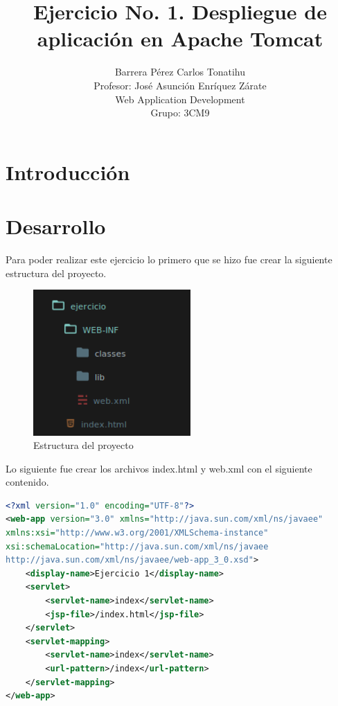 \documentclass[a4paper,12pt]{article}
\title{Ejercicio No. 1. Despliegue de aplicación en Apache Tomcat}
\author{Barrera Pérez Carlos Tonatihu \\ Profesor: José Asunción Enríquez 
Zárate 
\\ Web Application Development \\ Grupo: 3CM9 }
\begin{document}
\maketitle
\newpage
\tableofcontents
\newpage

\section{Introducción}
\section{Desarrollo}
Para poder realizar este ejercicio lo primero que se hizo fue crear la 
siguiente estructura del proyecto.

\begin{figure}[H]
\begin{center}
 \includegraphics[width=6cm]{estructura.png}
 \caption{Estructura del proyecto}
 \label{fig:estructura}
\end{center}
\end{figure}

Lo siguiente fue crear los archivos index.html y web.xml con el siguiente 
contenido.

\begin{lstlisting}[language=XML, style=customXML, 
caption={web.xml},captionpos=b]
<?xml version="1.0" encoding="UTF-8"?>
<web-app version="3.0" xmlns="http://java.sun.com/xml/ns/javaee" 
xmlns:xsi="http://www.w3.org/2001/XMLSchema-instance" 
xsi:schemaLocation="http://java.sun.com/xml/ns/javaee 
http://java.sun.com/xml/ns/javaee/web-app_3_0.xsd">
    <display-name>Ejercicio 1</display-name>
    <servlet>
        <servlet-name>index</servlet-name>
        <jsp-file>/index.html</jsp-file>
    </servlet>
    <servlet-mapping>
        <servlet-name>index</servlet-name>
        <url-pattern>/index</url-pattern>
    </servlet-mapping>
</web-app>
\end{lstlisting}
\end{document}
